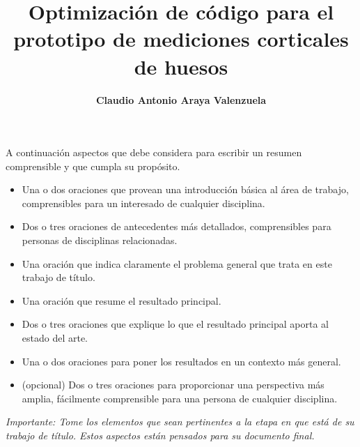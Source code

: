 \documentclass[12pt,letterpaper]{report}
\begin{document}
\title{\textbf{Optimización de código para el prototipo de mediciones corticales de huesos}}
\author{\textbf{Claudio Antonio Araya Valenzuela}}

\beforepreface
{}
A continuación aspectos que debe considera para escribir un resumen comprensible y que cumpla su propósito. 

\begin{itemize}
    \item Una o dos oraciones que provean una introducción básica al área de trabajo, comprensibles para un interesado de cualquier disciplina.
    \item Dos o tres oraciones de antecedentes más detallados, comprensibles para personas de disciplinas relacionadas.
    \item Una oración que indica claramente el problema general que trata en este trabajo de título.
    \item Una oración que resume el resultado principal.
    \item Dos o tres oraciones que explique lo que el resultado principal aporta al estado del arte.
    \item Una o dos oraciones para poner los resultados en un contexto más general.
    \item (opcional) Dos o tres oraciones para proporcionar una perspectiva más amplia, fácilmente comprensible para una persona de cualquier disciplina.

\end{itemize}

\textit{Importante: Tome los elementos que sean pertinentes a la etapa en que está de su trabajo de título. Estos aspectos están pensados para su documento final. 
}





%
%


%
%
%



\end{document}
